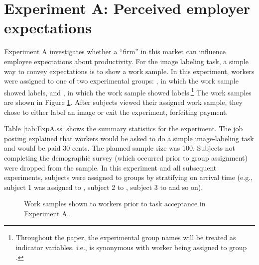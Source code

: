 \documentclass[12pt]{article}
\begin{document}
\section{Experiment A: Perceived employer expectations} 
Experiment A investigates whether a ``firm'' in this market can
influence employee expectations about productivity. For the image
labeling task, a simple way to convey expectations is to show a work
sample. In this experiment, workers were assigned to one of two
experimental groups: , in which the work sample showed 
labels, and , in which the work sample showed 
labels.\footnote{Throughout the paper, the experimental group names
  will be treated as indicator variables, i.e.,  is synonymous
  with worker  being assigned to group .}  The work samples
are shown in Figure \ref{fig:work.samples}.  After subjects viewed
their assigned work sample, they chose to either label an image or
exit the experiment, forfeiting payment.



Table \ref{tab:ExpA.ss} shows the summary statistics for the
experiment. The job posting explained that workers would be asked to
do a simple image-labeling task and would be paid 30 cents. The
planned sample size was 100. Subjects not completing the demographic
survey (which occurred prior to group assignment) were dropped from
the sample. In this experiment and all subsequent experiments,
subjects were assigned to groups by stratifying on arrival time (e.g.,
subject 1 was assigned to , subject 2 to , subject 3 to
 and so on).

\begin{figure}
  \centering 
  \caption{Work samples shown to workers prior to task acceptance in
    Experiment A.\label{fig:work.samples}}
\end{figure} 
\end{document}
